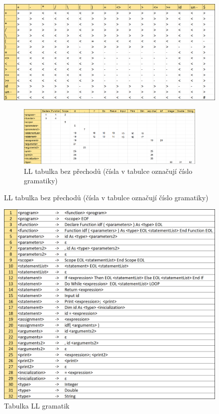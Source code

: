 \documentclass[11pt,a4paper]{article}
\begin{document}
\begin{figure}[H]
	\centering
	\includegraphics[width=17cm]{png/Precedencni_tabulka.png} 
	\caption{Precedenční tabulka}

\begin{figure}[H]
	
	\includegraphics[width=17cm]{png/LL_Tabulka.png} 
	\caption{LL tabulka bez \epsilon přechodů (čísla v tabulce označují číslo gramatiky)}

\end{figure}

\end{figure}

\begin{figure}[H]
	
	\includegraphics[width=17cm]{png/LL_Gramatika.png} 
	\caption{Tabulka LL gramatik}

\end{figure}
\end{document}
